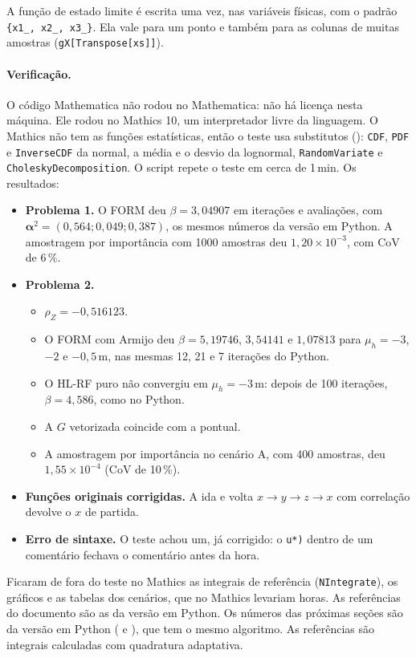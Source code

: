 \documentclass[11pt,a4paper]{article}
\begin{document}
A função de estado limite é escrita uma vez, nas variáveis físicas, com o padrão \texttt{\{x1\_, x2\_, x3\_\}}. Ela
vale para um ponto e também para as colunas de muitas amostras (\texttt{gX[Transpose[xs]]}).

\paragraph{Verificação.} O código Mathematica não rodou no Mathematica: não há licença nesta máquina. Ele rodou no
Mathics 10, um interpretador livre da linguagem. O Mathics não tem as funções estatísticas, então o teste usa
substitutos (): \texttt{CDF}, \texttt{PDF} e \texttt{InverseCDF} da normal, a média e o desvio da
lognormal, \texttt{RandomVariate} e \texttt{CholeskyDecomposition}. O script  repete o
teste em cerca de 1\,min. Os resultados:
\begin{itemize}
  \item \textbf{Problema 1.} O FORM deu $\beta = 3{,}04907$ em \pUmIter{} iterações e \pUmAval{} avaliações, com
    $\bm\alpha^2 = (0{,}564; 0{,}049; 0{,}387)$, os mesmos números da versão em Python. A amostragem por importância
    com 1000 amostras deu $1{,}20 \times 10^{-3}$, com CoV de 6\,\%.
  \item \textbf{Problema 2.}
    \begin{itemize}
      \item $\rho_Z = -0{,}516123$.
      \item O FORM com Armijo deu $\beta = 5{,}19746$, $3{,}54141$ e $1{,}07813$ para $\mu_h = -3$, $-2$ e
        $-0{,}5$\,m, nas mesmas 12, 21 e 7 iterações do Python.
      \item O HL-RF puro não convergiu em $\mu_h = -3$\,m: depois de 100 iterações, $\beta = 4{,}586$, como no Python.
      \item A $G$ vetorizada coincide com a pontual.
      \item A amostragem por importância no cenário A, com 400 amostras, deu $1{,}55 \times 10^{-4}$ (CoV de 10\,\%).
    \end{itemize}
  \item \textbf{Funções originais corrigidas.} A ida e volta $x \to y \to z \to x$ com correlação devolve o $x$ de
    partida.
  \item \textbf{Erro de sintaxe.} O teste achou um, já corrigido: o \texttt{u*)} dentro de um comentário fechava o
    comentário antes da hora.
\end{itemize}
Ficaram de fora do teste no Mathics as integrais de referência (\texttt{NIntegrate}), os gráficos e as tabelas dos
cenários, que no Mathics levariam horas. As referências do documento são as da versão em Python.
Os números das próximas seções são da versão em Python ( e ), que
tem o mesmo algoritmo. As referências são integrais calculadas com quadratura adaptativa.
\end{document}
